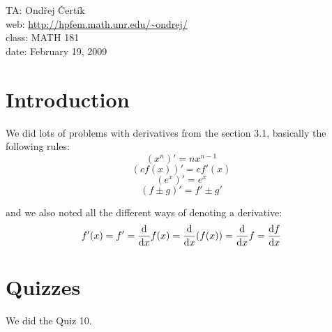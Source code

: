 \documentclass[10pt]{article}
\begin{document}
\noindent TA: Ondřej Čertík\\
web: \url{http://hpfem.math.unr.edu/~ondrej/}\\
class: MATH 181\\
date: February 19, 2009

\section{Introduction}

We did lots of problems with derivatives from the section 3.1, basically the
following rules:
$$(x^n)' = nx^{n-1}$$
$$(cf(x))' = cf'(x)$$
$$(e^x)' = e^x$$
$$(f\pm g)' = f'\pm g'$$

and we also noted all the different ways of denoting a derivative:
$$f'(x)
=f'
={{\rm d}\over{\rm d} x}f(x)
={{\rm d}\over{\rm d} x}(f(x))
={{\rm d}\over{\rm d} x}f
={{\rm d} f\over{\rm d} x}
$$

\section{Quizzes}

We did the Quiz 10.
\end{document}
